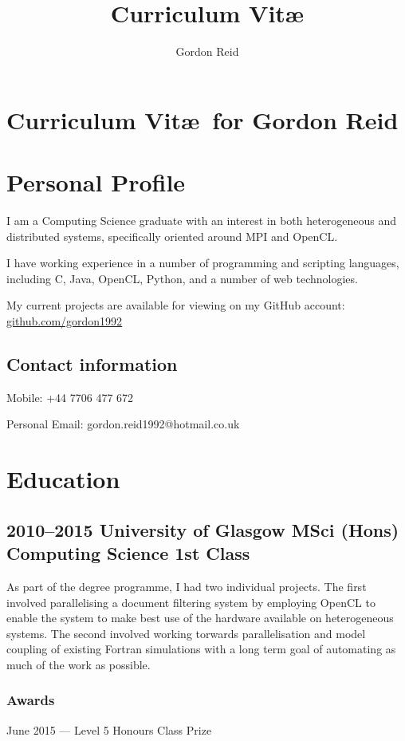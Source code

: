 \documentclass[11pt,a4paper]{article}
\title{Curriculum Vit\ae}
\author{Gordon Reid}
\begin{document}
\section*{Curriculum Vit\ae\ for Gordon Reid}

\section*{Personal Profile}

I am a Computing Science graduate with an interest in both heterogeneous and
distributed systems, specifically oriented around MPI and OpenCL\@.

I have working experience in a number of programming and scripting languages,
including C, Java, OpenCL, Python, and a number of web technologies.

My current projects are available for viewing on my GitHub
account: \url{github.com/gordon1992}

\subsection*{Contact information}
Mobile: +44 7706 477 672

Personal Email: gordon.reid1992@hotmail.co.uk

\section*{Education}

\subsection*{2010--2015 University of Glasgow MSci (Hons) Computing Science 1st Class}

As part of the degree programme, I had two individual projects. The first
involved parallelising a document filtering system by employing OpenCL to enable
the system to make best use of the hardware available on heterogeneous systems.
The second involved working torwards parallelisation and model coupling of
existing Fortran simulations with a long term goal of automating as much of the
work as possible.

\subsubsection*{Awards}

June 2015 --- Level 5 Honours Class Prize
\end{document}
